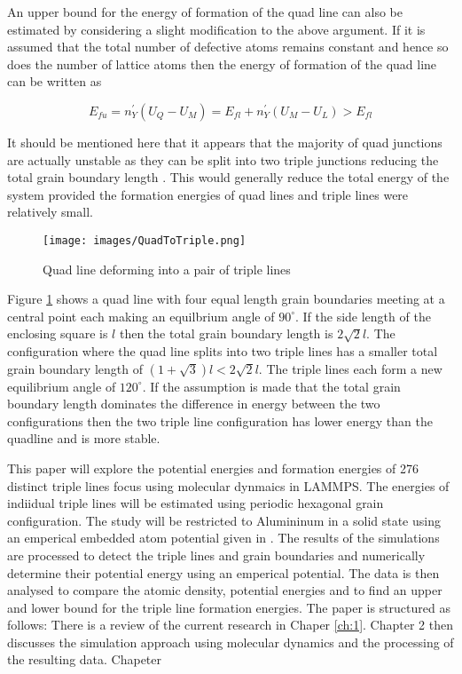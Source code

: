 \documentclass[12pt,a4paper]{book}
\begin{document}
An upper bound for the energy of formation of the quad line can also be estimated by considering a slight modification to the above argument. If it is assumed that the total number of defective atoms remains constant and hence so does the number of lattice atoms then the energy of formation of the quad line can
be written as

\[E_{fu} =  n_Y^{\prime}(U_Q - U_M) = E_{fl} + n_Y^{\prime}(U_M - U_L) > E_{fl} \]

It should be mentioned here that it appears that the majority of quad junctions are actually unstable as they can be split into two triple junctions reducing the total grain boundary length \cite{Lazar2011}. This would generally reduce the total energy of the system provided the formation energies of quad lines and triple lines were relatively small. 

\begin{figure}[H]
	\centering
	\texttt{[image: images/QuadToTriple.png]} 
	\label{fig:QuadToTriple}
	\caption{Quad line deforming into a pair of triple lines}
\end{figure}

Figure \ref{fig:QuadToTriple} shows a quad line with four equal length grain boundaries meeting at a central point each making an equilbrium angle of $90^{\circ}$. If the side length of the enclosing square is $l$ then the total grain boundary length is $2\sqrt{2}l$. The configuration where the quad line splits into two triple lines has a smaller total grain boundary length of $(1 + \sqrt{3})l < 2\sqrt{2}l$. The triple lines each form a new equilibrium angle of $120^{\circ}$. If the assumption is made that the total grain boundary length dominates the difference in energy between the two configurations then the two triple line configuration has lower energy than the quadline and is more stable. 

This paper will explore the potential energies and formation energies of 276 distinct triple lines focus using molecular dynmaics in LAMMPS. The energies of indiidual triple lines will be estimated using periodic hexagonal grain configuration. The study will be restricted to Alumininum in a solid state using an emperical embedded atom potential given in \cite{Zope2003}. The results of the simulations are processed to detect the triple lines and grain boundaries and numerically determine their potential energy using an emperical potential. The data is then analysed to compare the atomic density, potential energies and to find an upper and lower bound for the triple line formation energies. The paper is structured as follows: There is a review of the current research in Chaper \ref{ch:1}. Chapter 2 then discusses the simulation approach using molecular dynamics and the processing of the resulting data. Chapeter   
\end{document}
